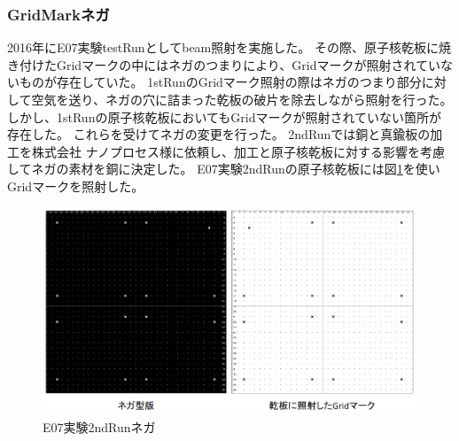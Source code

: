 \documentclass[12pt,a4paper]{jarticle}
\begin{document}
\subsubsection{GridMarkネガ}
2016年にE07実験testRunとしてbeam照射を実施した。
その際、原子核乾板に焼き付けたGridマークの中にはネガのつまりにより、Gridマークが照射されていないものが存在していた。
1stRunのGridマーク照射の際はネガのつまり部分に対して空気を送り、ネガの穴に詰まった乾板の破片を除去しながら照射を行った。
しかし、1stRunの原子核乾板においてもGridマークが照射されていない箇所が存在した。
これらを受けてネガの変更を行った。
2ndRunでは銅と真鍮板の加工を株式会社 ナノプロセス様に依頼し、加工と原子核乾板に対する影響を考慮してネガの素材を銅に決定した。
E07実験2ndRunの原子核乾板には図\ref{fig:nega_2ndRun}を使いGridマークを照射した。
\begin{figure}[htbp]
  \centering
    \includegraphics[width=140mm]{grid_nega2.png}
  \caption{E07実験2ndRunネガ\label{fig:nega_2ndRun}}
\end{figure}
\newpage
\end{document}
